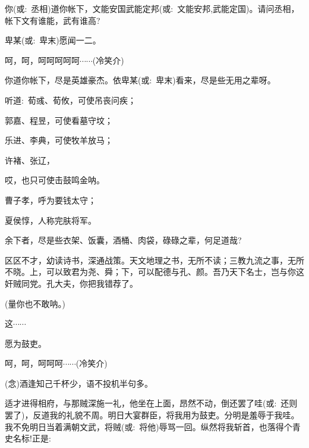 {你({\akai 或}:~丞相)道你帐下，文能安国武能定邦({\akai 或}:~文能安邦,武能定国)。请问丞相，帐下文有谁能，武有谁高?

卑某({\akai 或}:~卑末)愿闻一二。

呵，呵，呵呵呵呵呵$\cdots{}\cdots{}$({\hwfs 冷笑介})

你道你帐下，尽是英雄豪杰。依卑某({\akai 或}:~卑末)看来，尽是些无用之辈呀。

听道:~荀彧、荀攸，可使吊丧问疾；

郭嘉、程昱，可使看墓守坟；

乐进、李典，可使牧羊放马；

许褚、张辽，

哎，也只可使击鼓鸣金呐。

曹子孝，呼为要钱太守；

夏侯惇，人称完肤将军。

余下者，尽是些衣架、饭囊，酒桶、肉袋，碌碌之辈，何足道哉?

区区不才，幼读诗书，深通战策。天文地理之书，无所不读；三教九流之事，无所不晓。上，可以致君为尧、舜；下，可以配德与孔、颜。吾乃天下名士，岂与你这奸贼同党。孔大夫，你把我错荐了。


(量你也不敢呐。)

这$\cdots{}\cdots{}$

愿为鼓吏。

呵，呵，呵呵呵$\cdots{}\cdots{}$({\hwfs 冷笑介})


\vspace{5pt}



({\akai 念})酒逢知己千杯少，语不投机半句多。

适才进得相府，与那贼深施一礼，他坐在上面，昂然不动，倒还罢了哇({\akai 或}:~还则罢了)，反道我的礼貌不周。明日大宴群臣，将我用为鼓吏。分明是羞辱于我哇。我不免明日当着满朝文武，将贼({\akai 或}:~将他)辱骂一回。纵然将我斩首，也落得个青史名标!正是:~

}
